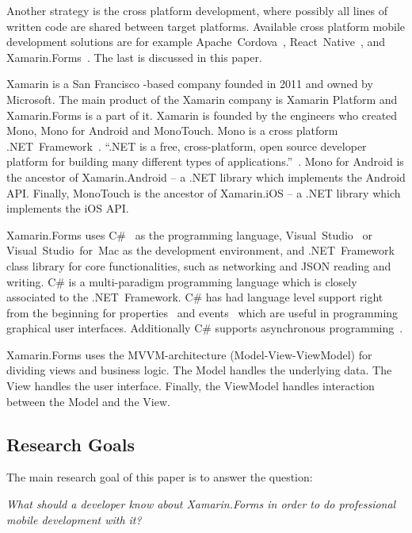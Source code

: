 \documentclass[conference]{IEEEtran}
\begin{document}
Another strategy is the cross platform development, where possibly all lines of written code are shared between target platforms. Available cross platform mobile development solutions are for example Apache~Cordova~\cite{cordova}, React~Native~\cite{react}, and Xamarin.Forms~\cite{xamarin.forms}. The last is discussed in this paper.

Xamarin is a San Francisco -based company founded in 2011 and owned by Microsoft. The main product of the Xamarin company is Xamarin Platform and Xamarin.Forms is a part of it. Xamarin is founded by the engineers who created Mono, Mono for Android and MonoTouch. Mono is a cross platform .NET~Framework~\cite{mono}. ``.NET is a free, cross-platform, open source developer platform for building many different types of applications.''~\cite{dotnet}. Mono for Android is the ancestor of Xamarin.Android -- a .NET library which implements the Android API. Finally, MonoTouch is the ancestor of Xamarin.iOS -- a .NET library which implements the iOS API.

Xamarin.Forms uses C\#~\cite{csharp} as the programming language, Visual~Studio~\cite{vs} or Visual~Studio~for~Mac as the development environment, and .NET~Framework class library for core functionalities, such as networking and JSON reading and writing. C\# is a multi-paradigm programming language which is closely associated to the .NET~Framework. C\# has had language level support right from the beginning for properties~\cite{properties} and events~\cite{events} which are useful in programming graphical user interfaces. Additionally C\# supports asynchronous programming~\cite{asyncro}.

Xamarin.Forms uses the MVVM-architecture (Model-View-ViewModel) for dividing views and business logic. The Model handles the underlying data. The View handles the user interface. Finally, the ViewModel handles interaction between the Model and the View.

\subsection*{Research Goals}

The main research goal of this paper is to answer the question:

\emph{What should a developer know about Xamarin.Forms in order to do professional mobile development with it?}

\nocite{xamarin}


\end{document}
